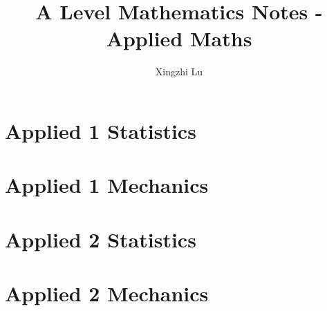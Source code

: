 \documentclass[oneside,fleqn,11pt]{book}
\title{A Level Mathematics Notes - Applied Maths}
\author{Xingzhi Lu}
\date{}
\begin{document}
\maketitle
\everymath{\displaystyle}

\tableofcontents

\part{Applied 1 Statistics}
\setcounter{chapter}{0}


\part{Applied 1 Mechanics}
\setcounter{chapter}{7}


\part{Applied 2 Statistics}
\setcounter{chapter}{0}


\part{Applied 2 Mechanics}
\setcounter{chapter}{3}

\end{document}
